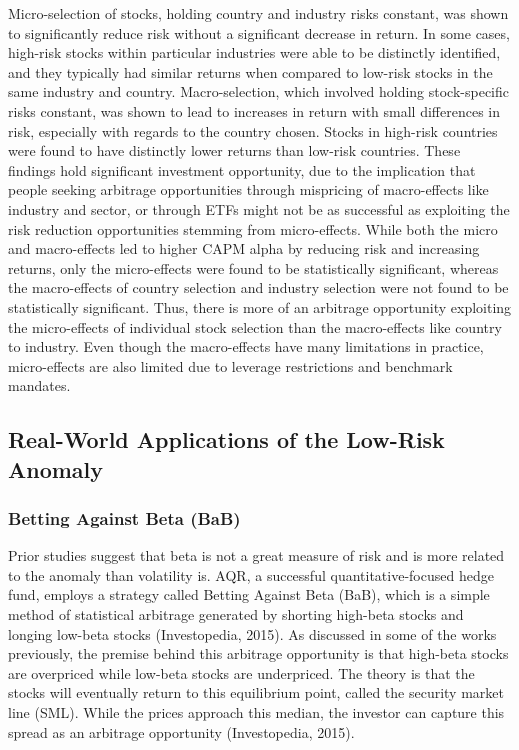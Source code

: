 \documentclass[12pt,twoside]{reedthesis}
\theoremstyle{definition}
\theoremstyle{definition}
\theoremstyle{definition}
\theoremstyle{remark}
\begin{document}
Micro-selection of stocks, holding country and industry risks constant,
was shown to significantly reduce risk without a significant decrease in
return. In some cases, high-risk stocks within particular industries
were able to be distinctly identified, and they typically had similar
returns when compared to low-risk stocks in the same industry and
country. Macro-selection, which involved holding stock-specific risks
constant, was shown to lead to increases in return with small
differences in risk, especially with regards to the country chosen.
Stocks in high-risk countries were found to have distinctly lower
returns than low-risk countries. These findings hold significant
investment opportunity, due to the implication that people seeking
arbitrage opportunities through mispricing of macro-effects like
industry and sector, or through ETFs might not be as successful as
exploiting the risk reduction opportunities stemming from micro-effects.
While both the micro and macro-effects led to higher CAPM alpha by
reducing risk and increasing returns, only the micro-effects were found
to be statistically significant, whereas the macro-effects of country
selection and industry selection were not found to be statistically
significant. Thus, there is more of an arbitrage opportunity exploiting
the micro-effects of individual stock selection than the macro-effects
like country to industry. Even though the macro-effects have many
limitations in practice, micro-effects are also limited due to leverage
restrictions and benchmark mandates.

\subsection{Real-World Applications of the Low-Risk
Anomaly}\label{real-world-applications-of-the-low-risk-anomaly}

\subsubsection{Betting Against Beta
(BaB)}\label{betting-against-beta-bab}

Prior studies suggest that beta is not a great measure of risk and is
more related to the anomaly than volatility is. AQR, a successful
quantitative-focused hedge fund, employs a strategy called Betting
Against Beta (BaB), which is a simple method of statistical arbitrage
generated by shorting high-beta stocks and longing low-beta stocks
(Investopedia, 2015). As discussed in some of the works previously, the
premise behind this arbitrage opportunity is that high-beta stocks are
overpriced while low-beta stocks are underpriced. The theory is that the
stocks will eventually return to this equilibrium point, called the
security market line (SML). While the prices approach this median, the
investor can capture this spread as an arbitrage opportunity
(Investopedia, 2015).
\end{document}
